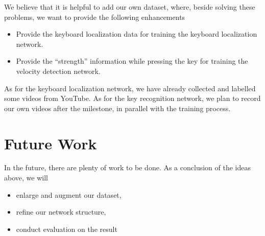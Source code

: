 \documentclass[10pt,twocolumn,letterpaper]{article}
\begin{document}
We believe that it is helpful to add our own dataset, where, beside solving these problems, we want to provide the following enhancements
\begin{itemize}
  \item Provide the keyboard localization data for training the keyboard localization network.
  \item Provide the ``strength'' information while pressing the key for training the velocity detection network.
\end{itemize}

As for the keyboard localization network, we have already collected and labelled some videos from YouTube. As for the key recognition network, we plan to record our own videos after the milestone, in parallel with the training process.

\section{Future Work}
  In the future, there are plenty of work to be done. As a conclusion of the ideas above, we will 
  \begin{itemize}
    \item enlarge and augment our dataset,
    \item refine our network structure,
    \item conduct evaluation on the result
  \end{itemize}

{\small


}
\end{document}
